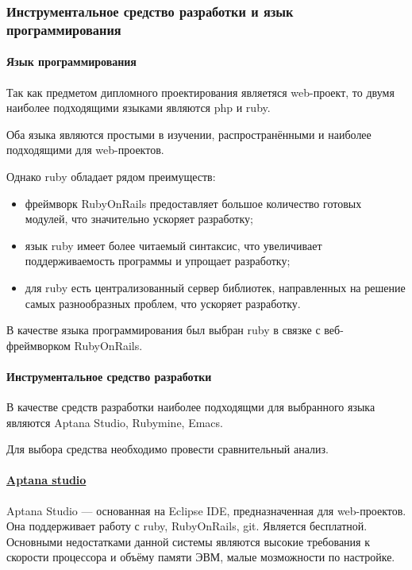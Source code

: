\subsubsection{Инструментальное средство разработки и язык программирования}

\paragraph{Язык программирования}

Так как предметом дипломного проектирования являетяся web-проект, то двумя наиболее подходящими языками являются php и ruby.

Оба языка являются простыми в изучении, распространёнными и наиболее подходящими для web-проектов.

Однако ruby обладает рядом преимуществ:
\begin{itemize}
\item фреймворк RubyOnRails предоставляет большое количество готовых модулей, что значительно ускоряет разработку;
\item язык ruby имеет более читаемый синтаксис, что увеличивает поддерживаемость программы и упрощает разработку;
\item для ruby есть централизованный сервер библиотек, направленных на решение самых разнообразных проблем, что ускоряет разработку.
\end{itemize}

В качестве языка программирования был выбран ruby в связке с веб-фреймворком RubyOnRails.

\paragraph{Инструментальное средство разработки}

В качестве средств разработки наиболее подходящми для выбранного языка являются Aptana Studio, Rubymine, Emacs.

Для выбора средства необходимо провести сравнительный анализ.

\paragraph{\href{http://aptana.com/}{Aptana studio}}

Aptana Studio --- основанная на Eclipse IDE, предназначенная для web-проектов. Она поддерживает работу с ruby, RubyOnRails, git. Является бесплатной. Основными недостатками данной системы являются высокие требования к скорости процессора и объёму памяти ЭВМ, малые мозможности по настройке.

